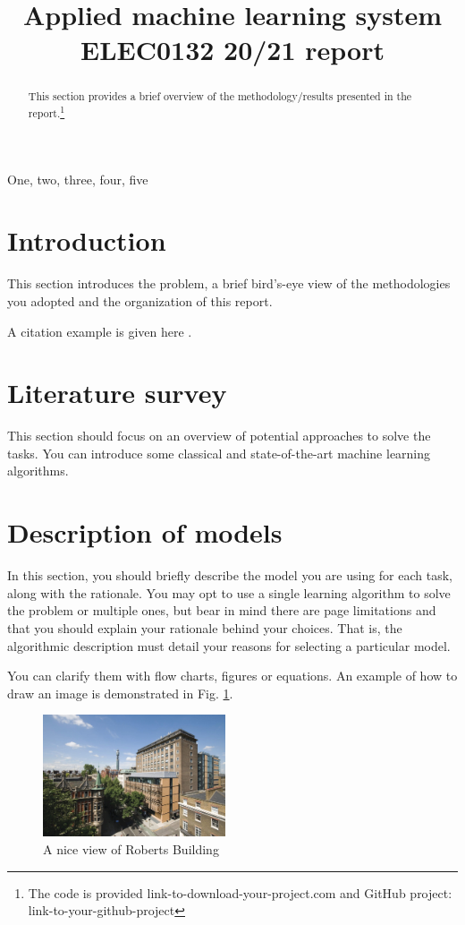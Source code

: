 \documentclass{article}
\title{Applied machine learning system ELEC0132 20/21 report}
\begin{document}
%
\maketitle
%
\begin{abstract}
    This section provides a brief overview of the methodology/results presented in the report.\footnote{The code is provided link-to-download-your-project.com and GitHub project: link-to-your-github-project}
\end{abstract}
%
\begin{keywords}
    One, two, three, four, five
\end{keywords}
%

\section{Introduction}
\label{sec:intro}
    This section introduces the problem, a brief bird's-eye view of the methodologies you adopted and the organization of this report.
    
    A citation example is given here \cite{C2}.


\section{Literature survey}
\label{sec:lite}
    This section should focus on an overview of potential approaches to solve the tasks. You can introduce some classical and state-of-the-art machine learning algorithms.


\section{Description of models}
\label{sec:models}
    In this section, you should briefly describe the model you are using for each task, along with the rationale. You may opt to use a single learning algorithm to solve the problem or multiple ones, but bear in mind there are page limitations and that you should explain your rationale behind your choices. That is, the algorithmic description must detail your reasons for selecting a particular model.
    
    You can clarify them with flow charts, figures or equations. An example of how to draw an image is demonstrated in Fig. \ref{fig:roberts_building}.
    
    \begin{figure}[htb]
    \centering
    \includegraphics[width=0.48\textwidth]{images/Roberts_building.jpg}
    \caption{A nice view of Roberts Building}
    \label{fig:roberts_building}
    \end{figure}
    
\end{document}
